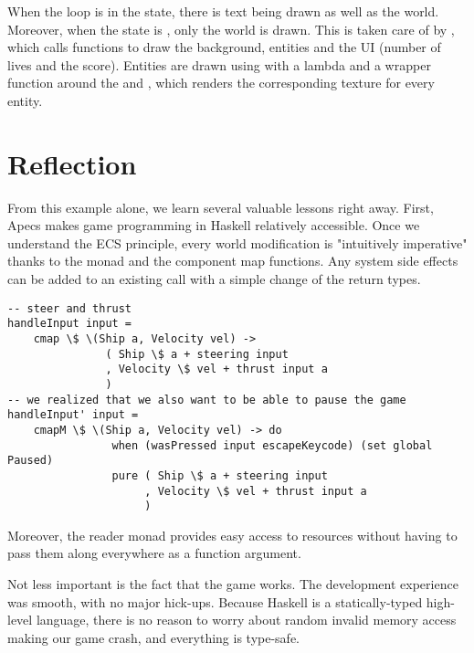 \documentclass[
  digital, %
  color,   %
  table,   %
  oneside, %
  lof,     %
  lot,     %
]{fithesis3}
\begin{document}
When the loop is in the  state, there is text being drawn
as well as the world. Moreover, when the state is ,
only the world is drawn. This is taken care of by ,
which calls functions to draw the background, entities and the UI
(number of lives and the score). Entities are drawn using 
with a lambda and a wrapper function around the  and
, which renders the corresponding texture for every entity.


\section{Reflection}
From this example alone, we learn several valuable lessons right away.
First, Apecs makes game programming in Haskell relatively accessible.
Once we understand the ECS principle, every world modification is
"intuitively imperative" thanks to the  monad and
the component map functions. Any system side effects can be added
to an existing  call with a simple change of the return types.
\begin{verbatim}
-- steer and thrust
handleInput input =
    cmap \$ \(Ship a, Velocity vel) ->
               ( Ship \$ a + steering input
               , Velocity \$ vel + thrust input a
               )
-- we realized that we also want to be able to pause the game
handleInput' input =
    cmapM \$ \(Ship a, Velocity vel) -> do
                when (wasPressed input escapeKeycode) (set global Paused)
                pure ( Ship \$ a + steering input
                     , Velocity \$ vel + thrust input a
                     )
\end{verbatim}

Moreover, the  reader monad provides easy
access to resources without having to pass them along everywhere as a function argument.

Not less important is the fact that the game works.
The development experience was smooth, with no major hick-ups.
Because Haskell is a statically-typed high-level language, there is
no reason to worry about random invalid memory access making our game crash,
and everything is type-safe.
\end{document}
